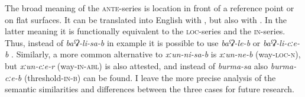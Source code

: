 The broad meaning of the \textsc{ante}-series is location in front of a reference point or on flat surfaces. It can be translated into English with , but also with . In the latter meaning it is functionally equivalent to the \textsc{loc}-series and the \textsc{in}-series. Thus, instead of \textit{baˁʡ-li-sa-b} in example  it is possible to use \textit{baˁʡ-le-b}  or \textit{baˁʡ-li-cːe-b} . Similarly, a more common alternative to \textit{xːun-ni-sa-b}  is \textit{xːun-ne-b} (way-\textsc{loc-n}), but \textit{xːun-cːe-r} (way-\textsc{in-abl}) is also attested, and instead of \textit{burma-sa}  also \textit{burma-cːe-b} (threshold-\textsc{in-b}) can be found. I leave the more precise analysis of the semantic similarities and differences between the three cases for future research.
%
